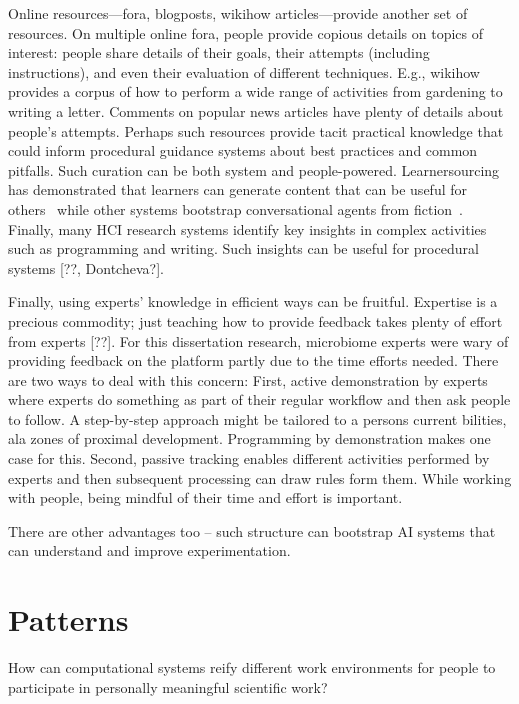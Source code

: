 Online resources---fora, blogposts, wikihow articles---provide another set of resources. On multiple online fora, people provide copious details on topics of interest: people share details of their goals, their attempts (including instructions), and even their evaluation of different techniques. E.g., wikihow provides a corpus of how to perform a wide range of activities from gardening to writing a letter. Comments on popular news articles have plenty of details about people's attempts. Perhaps such resources provide tacit practical knowledge that could inform procedural guidance systems about best practices and common pitfalls. Such curation can be both system and people-powered. Learnersourcing has demonstrated that learners can generate content that can be useful for others~\cite{Kim2015f} while other systems bootstrap conversational agents from fiction~\cite{fast2016empath}. Finally, many HCI research systems identify key insights in complex activities such as programming and writing. Such insights can be useful for procedural systems [??, Dontcheva?]. 

Finally, using experts' knowledge in efficient ways can be fruitful. Expertise is a precious commodity; just teaching how to provide feedback takes plenty of effort from experts [??]. For this dissertation research, microbiome experts were wary of providing feedback on the platform partly due to the time efforts needed. There are two ways to deal with this concern: First, active demonstration by experts where experts do something as part of their regular workflow and then ask people to follow. A step-by-step approach might be tailored to a person\textquotesingle s current bilities, ala zones of proximal development. Programming by demonstration makes one case for this. Second, passive tracking enables different activities performed by experts and then subsequent processing can draw rules form them. While working with people, being mindful of their time and effort is important.%

There are other advantages too -- such structure can bootstrap AI systems that can understand and improve experimentation. 


\section{Patterns} 
How can computational systems reify different work environments for people to participate in personally meaningful scientific work?

